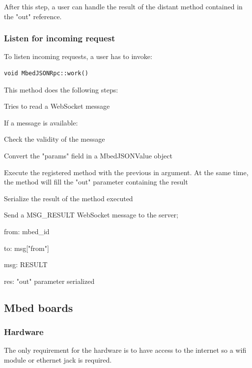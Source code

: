 \documentclass[pdftex,10pt,a4paper]{report}
\newenvironment{packed_item}{
\begin{itemize}
  \setlength{\itemsep}{1pt}
  \setlength{\parskip}{0pt}
  \setlength{\parsep}{0pt}
}{\end{itemize}}
\begin{document}
After this step, a user can handle the result of the distant method contained in the "out" reference.

\subsubsection{Listen for incoming request}
To listen incoming requests, a user has to invoke:
\begin{lstlisting}[label=Listen incoming requests,caption=Listen incoming requests]
void MbedJSONRpc::work()
\end{lstlisting}

This method does the following steps:
\begin{packed_item}
	\item Tries to read a WebSocket message
	\item If a message is available:
		\begin{packed_item}
			\item Check the validity of the message
			\item Convert the "params" field in a MbedJSONValue object
			\item Execute the registered method with the previous in argument. At the same time, the method will fill the "out" parameter containing the result
			\item Serialize the result of the method executed
			\item Send a MSG\_RESULT WebSocket message to the server;
			\begin{packed_item}
				\item from: mbed\_id
				\item to: msg["from"]
				\item msg: RESULT
				\item res: "out" parameter serialized
			\end{packed_item}
		\end{packed_item}
\end{packed_item}


\subsection{Mbed boards}
\subsubsection{Hardware}
The only requirement for the hardware is to have access to the internet so a wifi module or ethernet jack is required.
\end{document}
